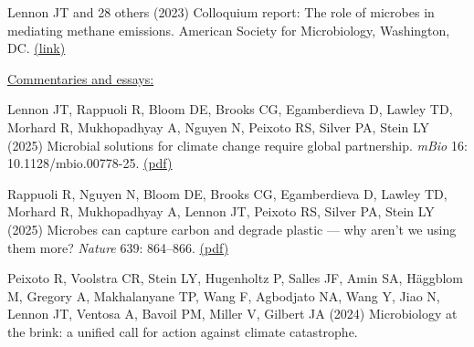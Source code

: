 \documentclass[11pt]{article}
\begin{document}
\begin{etaremune}
\item Lennon JT and 28 others (2023) Colloquium report: The role of microbes in mediating methane emissions. American Society for Microbiology, Washington, DC. \href{https://pubmed.ncbi.nlm.nih.gov/38194471/}{(link)}

\vspace{1em}
\item[] \textnormal{\underline{Commentaries and essays:}}

\item Lennon JT, Rappuoli R, Bloom DE, Brooks CG, Egamberdieva D, Lawley TD, Morhard R, Mukhopadhyay A, Nguyen N, Peixoto RS, Silver PA, Stein LY (2025) Microbial solutions for climate change require global partnership. \textit{mBio} 16: 10.1128/mbio.00778-25. \href{https://lennonlab.github.io/assets/publications/Lennon_etal_2025a.pdf}{(pdf)}

\item Rappuoli R, Nguyen N, Bloom DE, Brooks CG, Egamberdieva D, Lawley TD, Morhard R, Mukhopadhyay A, Lennon JT, Peixoto RS, Silver PA, Stein LY (2025) Microbes can capture carbon and degrade plastic — why aren’t we using them more? \textit{Nature} 639: 864–866. \href{https://lennonlab.github.io/assets/publications/Rappuoli_etal_2025a.pdf}{(pdf)}

\item Peixoto R, Voolstra CR, Stein LY, Hugenholtz P, Salles JF, Amin SA, Häggblom M, Gregory A, Makhalanyane TP, Wang F, Agbodjato NA, Wang Y, Jiao N, Lennon JT, Ventosa A, Bavoil PM, Miller V, Gilbert JA (2024) Microbiology at the brink: a unified call for action against climate catastrophe. 


\end{etaremune}
\end{document}
